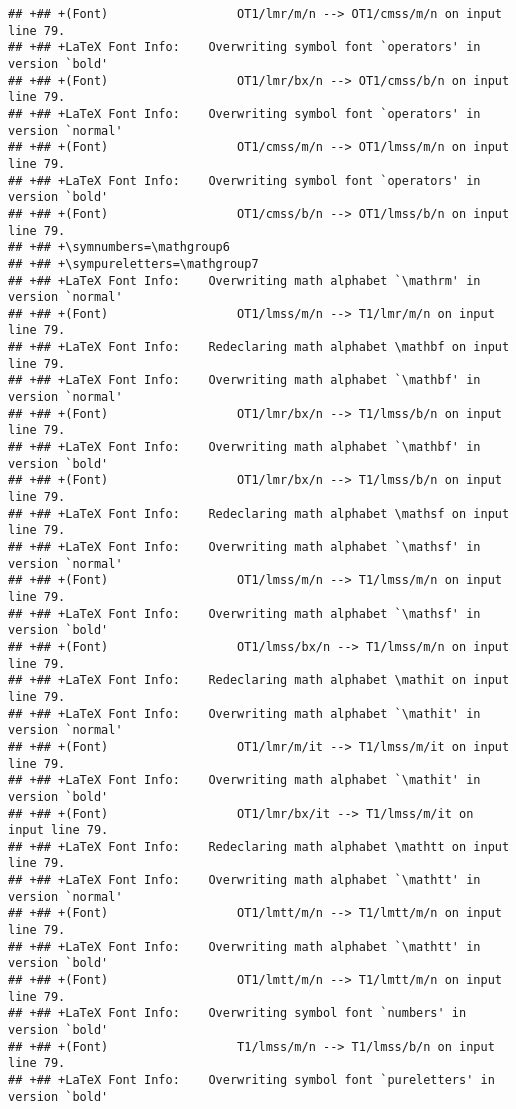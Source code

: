 \documentclass[ignorenonframetext,]{beamer}
\begin{document}
\begin{verbatim}
## +## +(Font)                  OT1/lmr/m/n --> OT1/cmss/m/n on input line 79.
## +## +LaTeX Font Info:    Overwriting symbol font `operators' in version `bold'
## +## +(Font)                  OT1/lmr/bx/n --> OT1/cmss/b/n on input line 79.
## +## +LaTeX Font Info:    Overwriting symbol font `operators' in version `normal'
## +## +(Font)                  OT1/cmss/m/n --> OT1/lmss/m/n on input line 79.
## +## +LaTeX Font Info:    Overwriting symbol font `operators' in version `bold'
## +## +(Font)                  OT1/cmss/b/n --> OT1/lmss/b/n on input line 79.
## +## +\symnumbers=\mathgroup6
## +## +\sympureletters=\mathgroup7
## +## +LaTeX Font Info:    Overwriting math alphabet `\mathrm' in version `normal'
## +## +(Font)                  OT1/lmss/m/n --> T1/lmr/m/n on input line 79.
## +## +LaTeX Font Info:    Redeclaring math alphabet \mathbf on input line 79.
## +## +LaTeX Font Info:    Overwriting math alphabet `\mathbf' in version `normal'
## +## +(Font)                  OT1/lmr/bx/n --> T1/lmss/b/n on input line 79.
## +## +LaTeX Font Info:    Overwriting math alphabet `\mathbf' in version `bold'
## +## +(Font)                  OT1/lmr/bx/n --> T1/lmss/b/n on input line 79.
## +## +LaTeX Font Info:    Redeclaring math alphabet \mathsf on input line 79.
## +## +LaTeX Font Info:    Overwriting math alphabet `\mathsf' in version `normal'
## +## +(Font)                  OT1/lmss/m/n --> T1/lmss/m/n on input line 79.
## +## +LaTeX Font Info:    Overwriting math alphabet `\mathsf' in version `bold'
## +## +(Font)                  OT1/lmss/bx/n --> T1/lmss/m/n on input line 79.
## +## +LaTeX Font Info:    Redeclaring math alphabet \mathit on input line 79.
## +## +LaTeX Font Info:    Overwriting math alphabet `\mathit' in version `normal'
## +## +(Font)                  OT1/lmr/m/it --> T1/lmss/m/it on input line 79.
## +## +LaTeX Font Info:    Overwriting math alphabet `\mathit' in version `bold'
## +## +(Font)                  OT1/lmr/bx/it --> T1/lmss/m/it on input line 79.
## +## +LaTeX Font Info:    Redeclaring math alphabet \mathtt on input line 79.
## +## +LaTeX Font Info:    Overwriting math alphabet `\mathtt' in version `normal'
## +## +(Font)                  OT1/lmtt/m/n --> T1/lmtt/m/n on input line 79.
## +## +LaTeX Font Info:    Overwriting math alphabet `\mathtt' in version `bold'
## +## +(Font)                  OT1/lmtt/m/n --> T1/lmtt/m/n on input line 79.
## +## +LaTeX Font Info:    Overwriting symbol font `numbers' in version `bold'
## +## +(Font)                  T1/lmss/m/n --> T1/lmss/b/n on input line 79.
## +## +LaTeX Font Info:    Overwriting symbol font `pureletters' in version `bold'

\end{verbatim}
\end{document}
